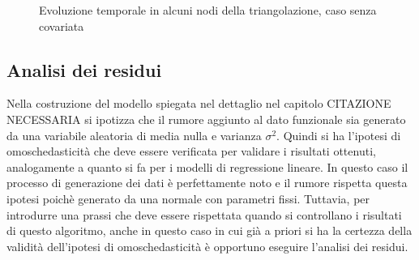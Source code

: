 \documentclass[a4paper,11pt,twoside,openright]{book}							%
\begin{document}
\begin{figure}[t]
	\centering
	\caption{Evoluzione temporale in alcuni nodi della triangolazione, caso senza covariata}
	\label{fig:DomC_ris2}
\end{figure}

\subsection{Analisi dei residui}
Nella costruzione del modello spiegata nel dettaglio nel capitolo CITAZIONE NECESSARIA si ipotizza che il rumore aggiunto al dato funzionale sia generato da una variabile aleatoria di media nulla e varianza $\sigma^2$. Quindi si ha l'ipotesi di omoschedasticità che deve essere verificata per validare i risultati ottenuti, analogamente a quanto si fa per i modelli di regressione lineare. In questo caso il processo di generazione dei dati è perfettamente noto e il rumore rispetta questa ipotesi poichè generato da una normale con parametri fissi. Tuttavia, per introdurre una prassi che deve essere rispettata quando si controllano i risultati di questo algoritmo, anche in questo caso in cui già a priori si ha la certezza della validità dell'ipotesi di omoschedasticità è opportuno eseguire l'analisi dei residui.
\end{document}
